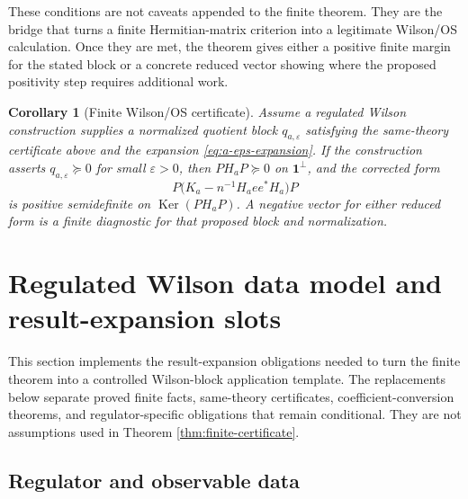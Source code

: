 \documentclass[11pt]{article}
\newtheorem{corollary}[theorem]{Corollary}
\newcommand{\one}{\mathbf 1}
\newcommand{\eps}{\varepsilon}
\newcommand{\Ker}{\operatorname{Ker}}
\begin{document}
These conditions are not caveats appended to the finite theorem.  They are the bridge that turns a finite Hermitian-matrix criterion into a legitimate Wilson/OS calculation.  Once they are met, the theorem gives either a positive finite margin for the stated block or a concrete reduced vector showing where the proposed positivity step requires additional work.

\begin{corollary}[Finite Wilson/OS certificate]
\label{cor:same-theory-certificate}
Assume a regulated Wilson construction supplies a normalized quotient block \(q_{a,\eps}\) satisfying the same-theory certificate above and the expansion \eqref{eq:a-eps-expansion}.  If the construction asserts \(q_{a,\eps}\succeq0\) for small \(\eps>0\), then \(PH_aP\succeq0\) on \(\one^\perp\), and the corrected form
\begin{equation}
  P\bigl(K_a-n^{-1}H_aee^*H_a\bigr)P
  \label{eq:corrected-wilson-form}
\end{equation}
  is positive semidefinite on \(\Ker(PH_aP)\).  A negative vector for either reduced form is a finite diagnostic for that proposed block and normalization.
\end{corollary}

\section{Regulated Wilson data model and result-expansion slots}
\label{sec:expansion-slots}

This section implements the result-expansion obligations needed to turn the finite theorem into a controlled Wilson-block application template.  The replacements below separate proved finite facts, same-theory certificates, coefficient-conversion theorems, and regulator-specific obligations that remain conditional.  They are not assumptions used in Theorem \ref{thm:finite-certificate}.

\subsection{Regulator and observable data}
\end{document}

